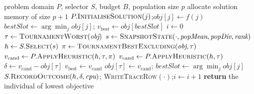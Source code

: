 \begin{algorithm}[htbp]
\caption{Multi-point selection hyper-heuristic (\texttt{MP-CF}). The replacement rule
acts as the acceptance criterion; the population best is never overwritten.}
\label{alg:mphh}
\begin{algorithmic}[1]
\Require problem domain $P$, selector $S$, budget $B$, population size $p$
\State allocate solution memory of size $p + 1$
  \State $P.\textsc{InitialiseSolution}(j)$;\quad $\textit{obj}[j] \gets f(j)$
\EndFor
\State $\textit{bestSlot} \gets \arg\min_j \textit{obj}[j]$;\quad
       $v_{\text{best}} \gets \textit{obj}[\textit{bestSlot}]$
\State $i \gets 0$
  \State $\tau \gets \textsc{TournamentWorst}(\textit{obj})$
  \State $s \gets \textsc{SnapshotState}(\cdot, \textit{popMean}, \textit{popDiv}, \textit{rank})$
  \State $h \gets S.\textsc{Select}(s)$
    \State $\pi \gets \textsc{TournamentBestExcluding}(\textit{obj}, \tau)$
    \State $v_{\text{cand}} \gets P.\textsc{ApplyHeuristic}(h, \tau, \pi)$
  \Else
    \State $v_{\text{cand}} \gets P.\textsc{ApplyHeuristic}(h, \tau)$
  \EndIf
  \State $\delta \gets v_{\text{cand}} - \textit{obj}[\tau]$
   \State $v_{\text{best}} \gets v_{\text{cand}}$ \EndIf
    \State $\textit{obj}[\tau] \gets v_{\text{cand}}$;\quad
           $\textit{bestSlot} \gets \arg\min_j \textit{obj}[j]$
  \EndIf
  \State $S.\textsc{RecordOutcome}(h, \delta, \textit{cpu})$;\quad
         \textsc{WriteTraceRow}$(\cdot)$;\quad $i \gets i + 1$
\EndWhile
\State \textbf{return} the individual of lowest objective
\end{algorithmic}
\end{algorithm}

